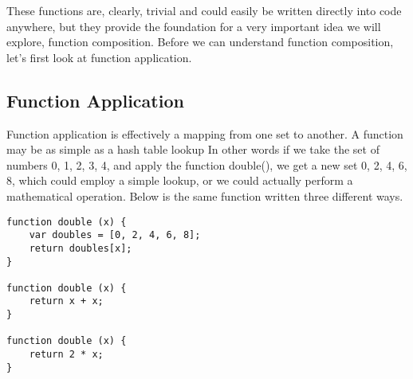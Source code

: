 \documentclass[a4paper,12pt,twoside]{book}
\begin{document}
 These functions are, clearly, trivial and could easily be written directly into code anywhere, but they provide the foundation for a very important idea we will explore, function composition. Before we can understand function composition, let's first look at function application.
 
\subsection{Function Application}
 
 Function application is effectively a mapping from one set to another. A function may be as simple as a hash table lookup In other words if we take the set of numbers {0, 1, 2, 3, 4}, and apply the function double(), we get a new set {0, 2, 4, 6, 8}, which could employ a simple lookup, or we could actually perform a mathematical operation.  Below is the same function written three different ways.
 
\begin{lstlisting}
function double (x) {
    var doubles = [0, 2, 4, 6, 8];
    return doubles[x];
}

function double (x) {
    return x + x;
}

function double (x) {
    return 2 * x;
}
\end{lstlisting}
\end{document}
